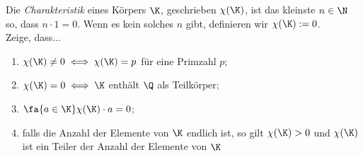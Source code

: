 \begin{prob}
  Die \textit{Charakteristik} eines Körpers $\K$, geschrieben $\chi(\K)$, ist
  das kleinste $n \in \N$ so, dass $n \cdot 1 = 0$. Wenn es kein solches $n$
  gibt, definieren wir $\chi(\K) := 0$. \\
  Zeige, dass...
  \begin{enumerate}[label=(\alph*)]
  \item $\chi(\K) \neq 0 \iff \chi(\K)=p$ für eine Primzahl $p$;
  \item $\chi(\K)= 0 \iff \K$ enthält $\Q$ als Teilkörper;
  \item $\fa{a \in \K} \chi(\K) \cdot a = 0$;
  \item falls die Anzahl der Elemente von $\K$ endlich ist, so gilt
    $\chi(\K) > 0$ und $\chi(\K)$ ist ein Teiler der Anzahl der Elemente von $\K$
  \end{enumerate}
\end{prob}
